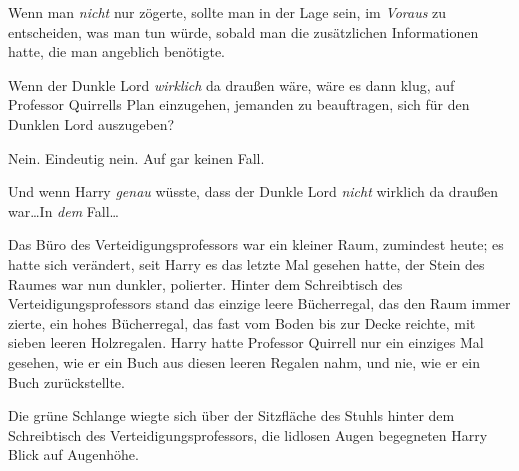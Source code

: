 Wenn man \emph{nicht} nur zögerte, sollte man in der Lage sein, im \emph{Voraus} zu entscheiden, was man tun würde, sobald man die zusätzlichen Informationen hatte, die man angeblich benötigte.

Wenn der Dunkle Lord \emph{wirklich} da draußen wäre, wäre es dann klug, auf Professor Quirrells Plan einzugehen, jemanden zu beauftragen, sich für den Dunklen Lord auszugeben?

Nein. Eindeutig nein. Auf gar keinen Fall.

Und wenn Harry \emph{genau} wüsste, dass der Dunkle Lord \emph{nicht} wirklich da draußen war…In \emph{dem} Fall…

Das Büro des Verteidigungsprofessors war ein kleiner Raum, zumindest heute; es hatte sich verändert, seit Harry es das letzte Mal gesehen hatte, der Stein des Raumes war nun dunkler, polierter. Hinter dem Schreibtisch des Verteidigungsprofessors stand das einzige leere Bücherregal, das den Raum immer zierte, ein hohes Bücherregal, das fast vom Boden bis zur Decke reichte, mit sieben leeren Holzregalen. Harry hatte Professor Quirrell nur ein einziges Mal gesehen, wie er ein Buch aus diesen leeren Regalen nahm, und nie, wie er ein Buch zurückstellte.

Die grüne Schlange wiegte sich über der Sitzfläche des Stuhls hinter dem Schreibtisch des Verteidigungsprofessors, die lidlosen Augen begegneten Harry Blick auf Augenhöhe.

